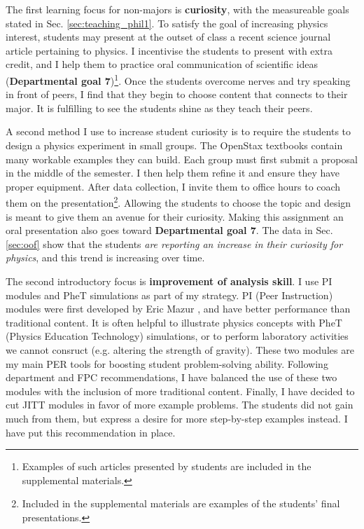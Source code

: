 \documentclass[../../../main.tex]{subfiles}
\begin{document}
The first learning focus for non-majors is \textbf{curiosity}, with the measureable goals stated in Sec. \ref{sec:teaching_phil1}.  To satisfy the goal of increasing physics interest, students may present at the outset of class a recent science journal article pertaining to physics.  I incentivise the students to present with extra credit, and I help them to practice oral communication of scientific ideas (\textbf{Departmental goal 7})\footnote{Examples of such articles presented by students are included in the supplemental materials.}.  Once the students overcome nerves and try speaking in front of peers, I find that they begin to choose content that connects to their major.  It is fulfilling to see the students shine as they teach their peers.  \\ \hspace{0.1cm}

A second method I use to increase student curiosity is to require the students to design a physics experiment in small groups.  The OpenStax textbooks contain many workable examples they can build.  Each group must first submit a proposal in the middle of the semester.  I then help them refine it and ensure they have proper equipment.  After data collection, I invite them to office hours to coach them on the presentation\footnote{Included in the supplemental materials are examples of the students' final presentations.}.  Allowing the students to choose the topic and design is meant to give them an avenue for their curiosity.  Making this assignment an oral presentation also goes toward \textbf{Departmental goal 7}.  The data in Sec. \ref{sec:oof} show that the students \textit{are reporting an increase in their curiosity for physics}, and this trend is increasing over time. \\ \hspace{0.1cm}

The second introductory focus is \textbf{improvement of analysis skill}.  I use PI modules and PheT simulations as part of my strategy.  PI (Peer Instruction) modules were first developed by Eric Mazur \cite{mazur2013peer}, and have better performance than traditional content.  It is often helpful to illustrate physics concepts with PheT (Physics Education Technology) simulations, or to perform laboratory activities we cannot consruct (e.g. altering the strength of gravity)\cite{phet}.  These two modules are my main PER tools for boosting student problem-solving ability.  Following department and FPC recommendations, I have balanced the use of these two modules with the inclusion of more traditional content.  Finally, I have decided to cut JITT modules \cite{jitt} in favor of more example problems.  The students did not gain much from them, but express a desire for more step-by-step examples instead.  I have put this recommendation in place.  \\ \hspace{0.1cm}
\end{document}
